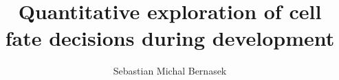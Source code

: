 \documentclass[12pt,reqno]{nuthesis}	%
\author{Sebastian Michal Bernasek}
\title{Quantitative exploration of cell fate decisions during development}
\begin{document}
%
%


\frontmatter		%

\maketitle		%

\copyrightpage		%

\abstract       %




\acknowledgements	%




\clearpage{} %
\tableofcontents	%

\clearpage{} %
\listoftables		%

\clearpage{} %
\listoffigures		%

\mainmatter             




%



%

%
\begin{singlespace}
\bibsep 12pt


\end{singlespace}

\appendix


\end{document}
